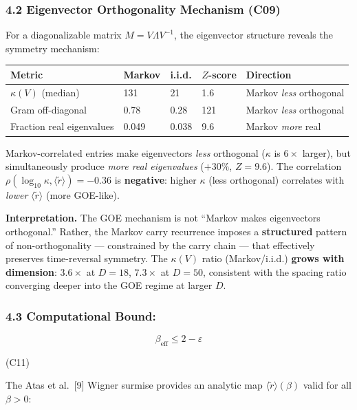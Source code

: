\documentclass[
  11pt,
]{article}
\begin{document}
\subsubsection{4.2 Eigenvector Orthogonality Mechanism
(C09)}\label{eigenvector-orthogonality-mechanism-c09}

For a diagonalizable matrix \(M = V \Lambda V^{-1}\), the eigenvector structure
reveals the symmetry mechanism:

\begin{longtable}[]{@{}lllll@{}}
\toprule\noalign{}
Metric & Markov & i.i.d. & \(Z\)-score & Direction \\
\midrule\noalign{}
\endhead
\bottomrule\noalign{}
\endlastfoot
\(\kappa(V)\) (median) & 131 & 21 & 1.6 & Markov \emph{less} orthogonal \\
Gram off-diagonal & 0.78 & 0.28 & 121 & Markov \emph{less} orthogonal \\
Fraction real eigenvalues & 0.049 & 0.038 & 9.6 & Markov \emph{more} real \\
\end{longtable}

Markov-correlated entries make eigenvectors \emph{less} orthogonal (\(\kappa\)
is \(6\times\) larger), but simultaneously produce \emph{more real eigenvalues}
(\(+30\%\), \(Z = 9.6\)). The correlation
\(\rho(\log_{10} \kappa, \langle\tilde{r}\rangle) = -0.36\) is
\textbf{negative}: higher \(\kappa\) (less orthogonal) correlates with
\emph{lower} \(\langle\tilde{r}\rangle\) (more GOE-like).

\textbf{Interpretation.} The GOE mechanism is not ``Markov makes eigenvectors
orthogonal.'' Rather, the Markov carry recurrence imposes a \textbf{structured}
pattern of non-orthogonality --- constrained by the carry chain --- that
effectively preserves time-reversal symmetry. The \(\kappa(V)\) ratio
(Markov/i.i.d.) \textbf{grows with dimension}: \(3.6\times\) at \(D = 18\),
\(7.3\times\) at \(D = 50\), consistent with the spacing ratio converging deeper
into the GOE regime at larger \(D\).

\subsubsection{4.3 Computational Bound:}\label{computational-bound}

\[\beta_{\mathrm{eff}} \leq 2 - \varepsilon\]

(C11)

The Atas et al.~{[}9{]} Wigner surmise provides an analytic map
\(\langle\tilde{r}\rangle(\beta)\) valid for all \(\beta > 0\):
\end{document}
